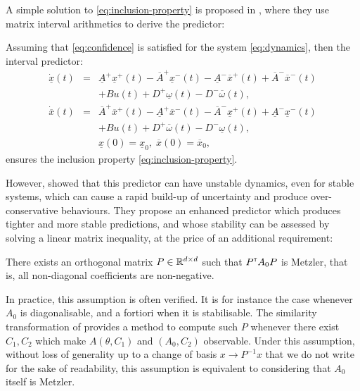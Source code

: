 \documentclass{article}
\begin{document}
A simple solution to \eqref{eq:inclusion-property} is proposed in \citep{efimov:hal-00701643}, where they use matrix interval arithmetics to derive the predictor:
\begin{proposition}
Assuming that \eqref{eq:confidence} is satisfied for the system \eqref{eq:dynamics}, then the interval predictor:
\begin{eqnarray}
\dot{\underline{x}}(t) & = & \underline{A}^{+}\underline{x}^{+}(t)-\overline{A}^{+}\underline{x}^{-}(t)-\underline{A}^{-}\overline{x}^{+}(t) +\overline{A}^{-}\overline{x}^{-}(t)\nonumber \\
 &  &+Bu(t) + D^{+}\underline{\omega}(t)-D^{-}\overline{\omega}(t),\label{eq:IP_direct}\\
\dot{\overline{x}}(t) & = & \overline{A}^{+}\overline{x}^{+}(t)-\underline{A}^{+}\overline{x}^{-}(t)-\overline{A}^{-}\underline{x}^{+}(t)+\underline{A}^{-}\underline{x}^{-}(t)\nonumber \\
 &  &+Bu(t) + D^{+}\overline{\omega}(t)-D^{-}\underline{\omega}(t),\nonumber \\
 &  & \underline{x}(0)=\underline{x}_{0},\;\overline{x}(0)=\overline{x}_{0},\nonumber 
\end{eqnarray}
ensures the inclusion property \eqref{eq:inclusion-property}.
\end{proposition}

However, \citet{leurent2019interval} showed that this predictor can have unstable dynamics, even for stable systems, which can cause a rapid build-up of uncertainty and produce over-conservative behaviours. They propose an enhanced predictor which produces tighter and more stable predictions, and whose stability can be assessed by solving a linear matrix inequality, at the price of an additional requirement:

\begin{assumption}
\label{assumpt:metzler}
There exists an orthogonal matrix $P\in\mathbb{R}^{d\times d}$ such that $P^{\mathsf{\scriptscriptstyle T}} A_0 P$ is Metzler, that is, all non-diagonal coefficients are non-negative.
\end{assumption}
In practice, this assumption is often verified. It is for instance the case whenever $A_0$ is diagonalisable, and a fortiori when it is stabilisable. The similarity transformation of \citep{Efimov_a2013} provides a method to compute such $P$ whenever there exist $C_1,C_2$ which make $A(\theta, C_1)$ and $(A_0, C_2)$ observable.
Under this assumption, without loss of generality up to a change of basis $x\rightarrow P^{-1}x$ that we do not write for the sake of readability, this assumption is equivalent to considering that $A_0$ itself is Metzler.
\end{document}
